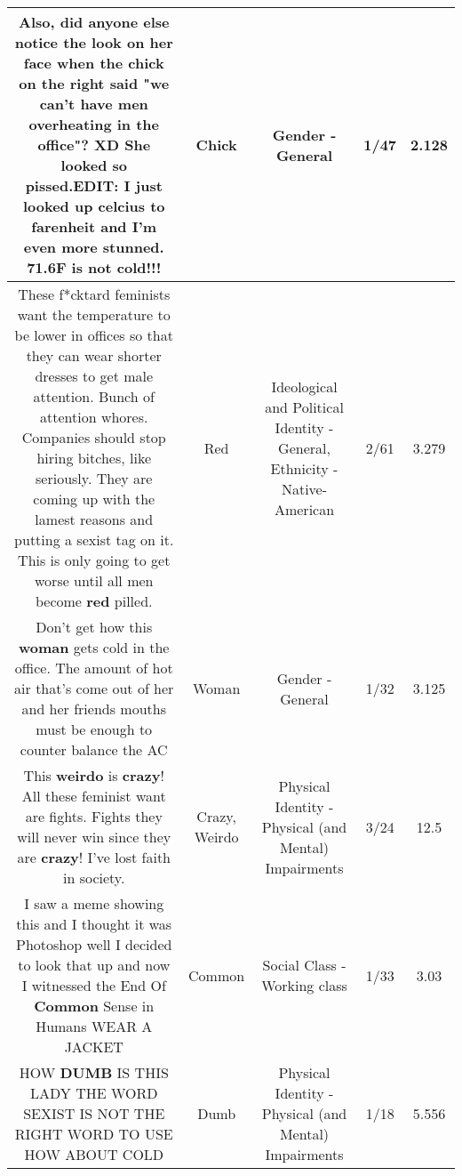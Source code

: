 \documentclass[11pt]{article}
\newlength\mylength
\begin{document}
\begin{center}
\begin{longtable}{|C{.65\mylength}|C{.30\mylength}|C{.12\mylength}|C{.12\mylength}|C{.12\mylength}|}
  \small Also, did anyone else notice the look on her face when the \textbf{chick} on the right said "we can't have men overheating in the office"? XD She looked so pissed.EDIT: I just looked up celcius to farenheit and I'm even more stunned. 71.6F is not cold!!!\normalsize   & Chick & Gender - General & 1/47 & 2.128 \\  \hline
  \small These f*cktard feminists want the temperature to be lower in offices so that they can wear shorter dresses to get male attention.  Bunch of attention whores.  Companies should stop hiring bitches, like seriously.  They are coming up with the lamest reasons and putting a sexist tag on it.  This is only going to get worse until all men become \textbf{r\textbf{ed}} pilled.\normalsize   & Red &  Ideological and Political Identity - General, Ethnicity - Native-American & 2/61 & 3.279 \\  \hline
  \small Don't get how this \textbf{woman} gets cold in the office. The amount of hot air that's come out of her and her friends mouths must be enough to counter balance the AC\normalsize   & Woman & Gender - General & 1/32 & 3.125 \\  \hline
  \small This \textbf{weirdo} is \textbf{crazy}! All these feminist want are fights. Fights they will never win since they are \textbf{crazy}! I've lost faith in society.\normalsize   & Crazy, Weirdo & Physical Identity - Physical (and Mental) Impairments & 3/24 & 12.5 \\  \hline
  \small I saw a meme showing this and I thought it was Photoshop well I decided to look that up and now I witnessed the End Of \textbf{Common} Sense in Humans WEAR A JACKET\normalsize   & Common & Social Class - Working class & 1/33 & 3.03 \\  \hline
  \small HOW \textbf{DUMB} IS THIS LADY THE WORD SEXIST IS NOT THE RIGHT WORD TO USE HOW ABOUT COLD\normalsize   & Dumb & Physical Identity - Physical (and Mental) Impairments & 1/18 & 5.556 \\  \hline

\end{longtable}
\end{center}
\end{document}
